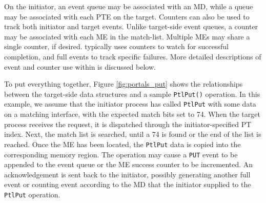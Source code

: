 On the initiator, an event queue may be associated with an MD, while 
a queue may be associated with each PTE on the target. Counters can
also be used to track both initiator and target events. Unlike
target-side event queues, a counter may be associated with each ME in
the match-list. Multiple MEs may share a single counter, if
desired. \pdht typically uses counters to watch for successful
completion, and full events to track specific failures. More detailed
descriptions of event and counter use within \pdht is discussed below.

To put everything together, Figure \ref{fig:portals_put} shows the
relationships between the target-side data structures and a sample
{\tt PtlPut()} operation. In this example, we assume that the
initiator process has called {\tt PtlPut} with some data on a matching
interface, with the expected match bits set to 74. When the target
process receives the request, it is dispatched through the
initiator-specified PT index. Next, the match list is searched, until
a 74 is found or the end of the list is reached. Once the ME has been
located, the {\tt PtlPut} data is copied into the corresponding memory
region. The operation may cause a {\tt PUT} event to be appended to
the event queue or the ME success counter to be incremented. An
acknowledgement is sent back to the initiator, possibly generating
another full event or counting event according to the MD that the initiator
supplied to the {\tt PtlPut} operation.




